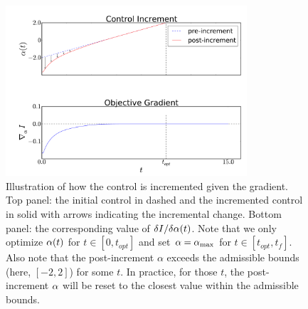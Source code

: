 \documentclass{article}
\begin{document}
\begin{figure}[htp]
\begin{center}
  \includegraphics[width=0.8\textwidth]{Figs/FP_Adjoint/control_increment_example.pdf}
  \caption[Single control-increment illustration]{Illustration of how the
  control is incremented given the gradient. Top panel: the
  initial control in dashed and the incremented control in solid with arrows
  indicating the incremental change. Bottom panel: the
  corresponding value of $\delta I/ \delta {\alpha} (t)$.
  Note that we only optimize ${\alpha}(t)$ for $t \in [0, t_{opt}]$ and set ${\alpha}={ {\alpha}_{\textrm{max}} }$
  for $t \in [t_{opt}, t_f]$. Also note that the post-increment $\alpha$ exceeds
  the admissible bounds (here, $[-2,2]$) for some $t$. In practice, for those
  $t$, the post-increment ${\alpha}$ will be reset to the closest value within the
  admissible bounds.}
  \label{fig:example_control_increment}    
\end{center}
\end{figure}
           
\end{document}

